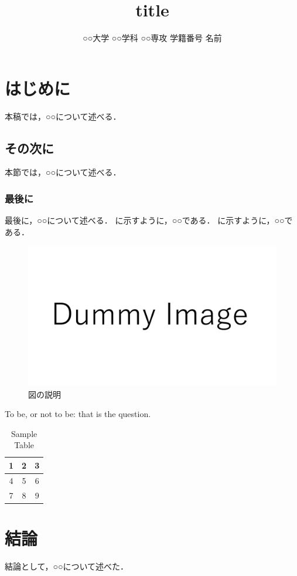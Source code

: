 \documentclass{classes/resume}
\title{
	title
}
\author{
	○○大学 ○○学科 ○○専攻 学籍番号 名前
}
\begin{document}
\maketitle

\section{はじめに}
本稿では，○○について述べる．
\subsection{その次に}
本節では，○○について述べる．
\subsubsection{最後に}
最後に，○○について述べる．
に示すように，○○である．
に示すように，○○である．

\begin{figure}[htbp]
    \centering
    \includegraphics[width=\linewidth]{figures/dummy.pdf}
    \caption{図の説明 \cite{ref:nomura2022uwb} \cite{ref:青空文庫Aozo22:online}}
    \label{fig:fig1}
\end{figure}


To be, or not to be: that is the question.


\begin{table}[h]
    \centering
    \caption{Sample Table}
    \begin{tabular}{|c|c|c|}
        \hline
        1 & 2 & 3 \\
        \hline
        4 & 5 & 6 \\
        \hline
        7 & 8 & 9 \\
        \hline
    \end{tabular}
    \label{tab:sample}
\end{table}

\section{結論}
結論として，○○について述べた．


\end{document}
